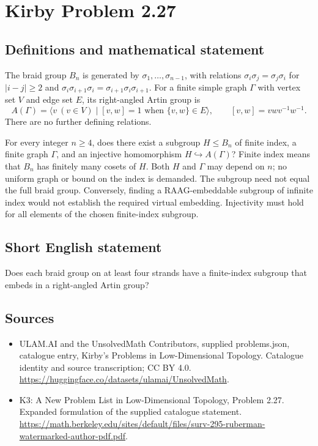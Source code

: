 \documentclass[11pt,a4paper]{article}
\begin{document}
\section*{Kirby Problem 2.27}\label{statement}

\subsection{Definitions and mathematical statement}
The braid group $B_n$ is generated by $\sigma_1,\ldots,\sigma_{n-1}$, with
relations $\sigma_i\sigma_j=\sigma_j\sigma_i$ for $|i-j|\geq2$ and
$\sigma_i\sigma_{i+1}\sigma_i=\sigma_{i+1}\sigma_i\sigma_{i+1}$.
For a finite simple graph $\Gamma$ with vertex set $V$ and edge set $E$, its
right-angled Artin group is
\[
A(\Gamma)=\langle v\ (v\in V)\mid [v,w]=1\text{ when }\{v,w\}\in E\rangle,
\qquad [v,w]=vwv^{-1}w^{-1}.
\]
There are no further defining relations.

For every integer $n\geq4$, does there exist a subgroup $H\leq B_n$ of finite
index, a finite graph $\Gamma$, and an injective homomorphism
$H\hookrightarrow A(\Gamma)$? Finite index means that $B_n$ has finitely many
cosets of $H$. Both $H$ and $\Gamma$ may depend on $n$; no uniform graph or
bound on the index is demanded.
The subgroup need not equal the full braid group. Conversely, finding a
RAAG-embeddable subgroup of infinite index would not establish the required
virtual embedding. Injectivity must hold for all elements of the chosen
finite-index subgroup.
\subsection{Short English statement}
Does each braid group on at least four strands have a finite-index subgroup that embeds in a right-angled Artin group?
\subsection{Sources}
\begin{itemize}
\item[S1] ULAM.AI and the UnsolvedMath Contributors, supplied problems.json, catalogue entry, Kirby's Problems in Low-Dimensional Topology. Catalogue identity and source transcription; CC BY 4.0.
\url{https://huggingface.co/datasets/ulamai/UnsolvedMath}.
\item[S2] K3: A New Problem List in Low-Dimensional Topology, Problem 2.27. Expanded formulation of the supplied catalogue statement.
\url{https://math.berkeley.edu/sites/default/files/surv-295-ruberman-watermarked-author-pdf.pdf}.
\end{itemize}
\end{document}
